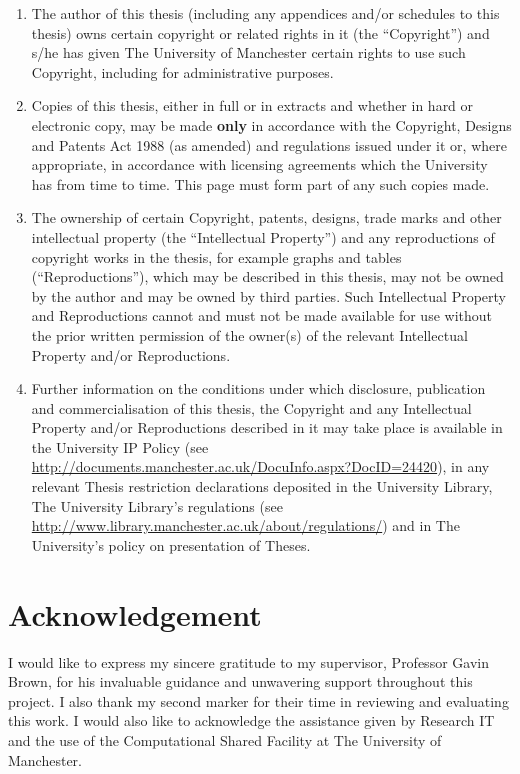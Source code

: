 \documentclass{article}
\begin{document}
\begin{enumerate}
    \item The author of this thesis (including any appendices and/or schedules to this thesis) owns certain copyright or related rights in it (the ``Copyright'') and s/he has given The University of Manchester certain rights to use such Copyright, including for administrative purposes. 
    
    \item Copies of this thesis, either in full or in extracts and whether in hard or electronic copy, may be made \textbf{only} in accordance with the Copyright, Designs and Patents Act 1988 (as amended) and regulations issued under it or, where appropriate, in accordance with licensing agreements which the University has from time to time. This page must form part of any such copies made. 
    
    \item The ownership of certain Copyright, patents, designs, trade marks and other intellectual property (the ``Intellectual Property'') and any reproductions of copyright works in the thesis, for example graphs and tables (``Reproductions''), which may be described in this thesis, may not be owned by the author and may be owned by third parties. Such Intellectual Property and Reproductions cannot and must not be made available for use without the prior written permission of the owner(s) of the relevant Intellectual Property and/or Reproductions. 
    
    \item Further information on the conditions under which disclosure, publication and commercialisation of this thesis, the Copyright and any Intellectual Property and/or Reproductions described in it may take place is available in the University IP Policy (see \url{http://documents.manchester.ac.uk/DocuInfo.aspx?DocID=24420}), in any relevant Thesis restriction declarations deposited in the University Library, The University Library's regulations (see \url{http://www.library.manchester.ac.uk/about/regulations/}) and in The University's policy on presentation of Theses. 
\end{enumerate}


\section{Acknowledgement}
I would like to express my sincere gratitude to my supervisor, Professor Gavin Brown, for his invaluable guidance and unwavering support throughout this project. I also thank my second marker for their time in reviewing and evaluating this work. 
I would also like to acknowledge the assistance given by Research IT and the use of the Computational Shared Facility at The University of Manchester. 
\end{document}
